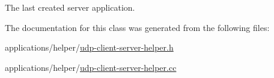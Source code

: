 The last created server application. 



The documentation for this class was generated from the following files\+:\begin{DoxyCompactItemize}
\item 
applications/helper/\hyperlink{udp-client-server-helper_8h}{udp-\/client-\/server-\/helper.\+h}\item 
applications/helper/\hyperlink{udp-client-server-helper_8cc}{udp-\/client-\/server-\/helper.\+cc}\end{DoxyCompactItemize}
